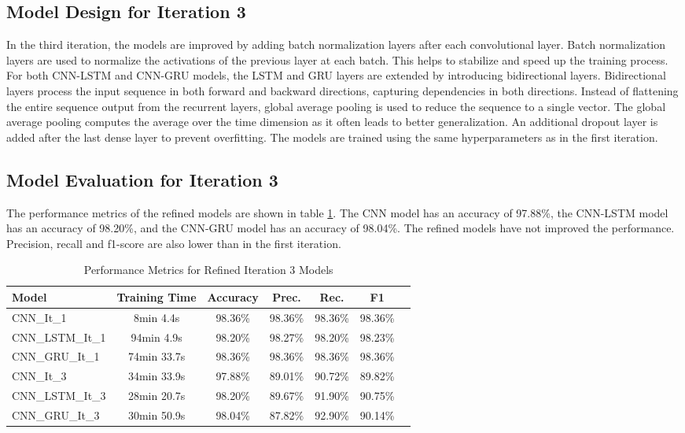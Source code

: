 \subsection{Model Design for Iteration 3}
In the third iteration, the models are improved by adding batch normalization layers after each convolutional layer. Batch normalization layers are used to normalize the activations of the previous layer at each batch. This helps to stabilize and speed up the training process. 
For both CNN-LSTM and CNN-GRU models, the LSTM and GRU layers are extended by introducing bidirectional layers. Bidirectional layers process the input sequence in both forward and backward directions, capturing dependencies in both directions. Instead of flattening the entire sequence output from the recurrent layers, global average pooling is used to reduce the sequence to a single vector. The global average pooling computes the average over the time dimension as it often leads to better generalization. An additional dropout layer is added after the last dense layer to prevent overfitting.
The models are trained using the same hyperparameters as in the first iteration.

\subsection{Model Evaluation for Iteration 3}
The performance metrics of the refined models are shown in table \ref{tab:eval_metrics_it3}. The CNN model has an accuracy of 97.88\%, the CNN-LSTM model has an accuracy of 98.20\%, and the CNN-GRU model has an accuracy of 98.04\%. The refined models have not improved the performance. Precision, recall and f1-score are also lower than in the first iteration.

\begin{table}[hbt]
    \centering
    \caption{Performance Metrics for Refined Iteration 3 Models}
    \label{tab:eval_metrics_it3}
    \begin{tabular}{lcccccc}
        \toprule
        \textbf{Model} & \textbf{Training Time} & \textbf{Accuracy} & \textbf{Prec.} & \textbf{Rec.} & \textbf{F1} \\
        \midrule
        CNN\_It\_1     & 8min 4.4s  & 98.36\% & 98.36\% & 98.36\% & 98.36\% \\
        CNN\_LSTM\_It\_1 & 94min 4.9s & 98.20\% & 98.27\% & 98.20\% & 98.23\% \\
        CNN\_GRU\_It\_1  & 74min 33.7s & 98.36\% & 98.36\% & 98.36\% & 98.36\% \\

        CNN\_It\_3      & 34min 33.9s & 97.88\% & 89.01\% & 90.72\% & 89.82\% \\
        CNN\_LSTM\_It\_3 & 28min 20.7s & 98.20\% & 89.67\% & 91.90\% & 90.75\% \\
        CNN\_GRU\_It\_3  & 30min 50.9s & 98.04\% & 87.82\% & 92.90\% & 90.14\% \\
        \bottomrule
    \end{tabular}
\end{table}

